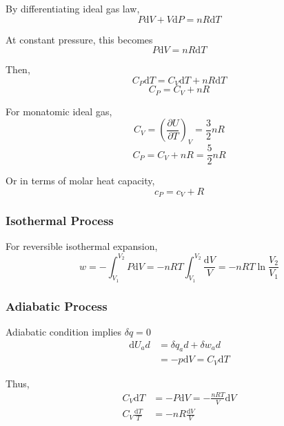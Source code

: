 \documentclass[letterpaper]{article}
\newcommand{\diff}{\mathrm{d}}
\begin{document}
By differentiating ideal gas law,
\begin{equation*}
    P\diff V+V\diff P=nR\diff T
\end{equation*}

At constant pressure, this becomes
\begin{equation*}
    P\diff V=nR\diff T
\end{equation*}

Then,
\begin{equation*}
    C_P\diff T=C_V\diff T+nR\diff T
\end{equation*}
\begin{equation*}
    \boxed{C_P=C_V+nR}
\end{equation*}

For monatomic ideal gas,
\begin{equation*}
    C_V=(\frac{\partial U}{\partial T})_V=\frac{3}{2}nR
\end{equation*}
\begin{equation*}
    C_P=C_V+nR=\frac{5}{2}nR
\end{equation*}

Or in terms of molar heat capacity,
\begin{equation*}
    c_P=c_V+R
\end{equation*}
\subsubsection*{Isothermal Process}
For reversible isothermal expansion,
\begin{equation*}
    w=-\int_{V_1}^{V_2}P\diff V=-nRT\int_{V_1}^{V_2}\frac{\diff V}{V}=-nRT\ln\frac{V_2}{V_1}
\end{equation*}
\subsubsection*{Adiabatic Process}
Adiabatic condition implies $\delta q=0$
\begin{equation*}
    \begin{aligned}
        \diff U_ad&=\delta q_ad + \delta w_ad\\
        &=-p\diff V=C_V\diff T
    \end{aligned}
\end{equation*}

Thus,
\begin{equation*}
    \begin{aligned}
        C_V\diff T&=-P\diff V=-\frac{nRT}{V}\diff V\\
        C_V\frac{\diff T}{T}&=-nR\frac{\diff V}{V}
    \end{aligned}
\end{equation*}
\end{document}
